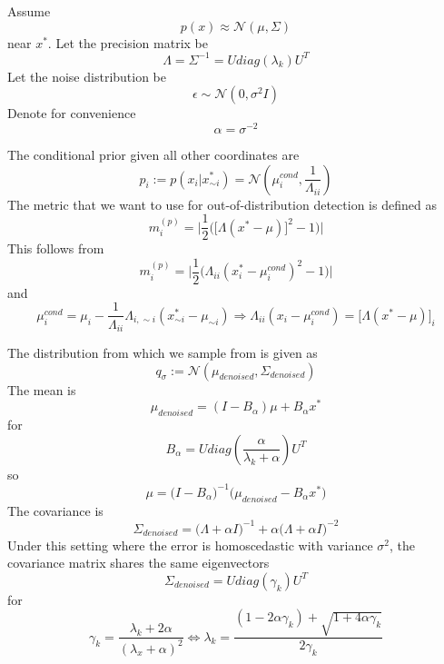 Assume
\begin{equation}
    p(x)\approx\mathcal{N}(\mu,\Sigma)
\end{equation} near $x^*$. Let the precision matrix be
\begin{equation}
    \Lambda=\Sigma^{-1}=Udiag(\lambda_k)U^T
\end{equation}
Let the noise distribution be
\begin{equation}
    \epsilon\sim\mathcal{N}(0,\sigma^2I)
\end{equation}
Denote for convenience
\begin{equation}
    \alpha=\sigma^{-2}
\end{equation}

\hfill \break
The conditional prior given all other coordinates are
\begin{equation}
    p_i:=p(x_i|x_{\sim i}^*)=\mathcal{N}(\mu_i^{cond},\frac{1}{\Lambda_{ii}})
\end{equation}
The metric that we want to use for out-of-distribution detection is defined as
\begin{equation}
    m_i^{(p)}=\Big\vert\frac{1}{2}\Big(\big[\Lambda(x^*-\mu)\big]^2-1\Big)\Big\vert
\end{equation}
This follows from
\begin{equation}
    m_i^{(p)}=\Big\vert\frac{1}{2}\Big(\Lambda_{ii}(x_i^*-\mu^{cond}_i)^2-1\Big)\Big\vert
\end{equation}
and
\begin{equation}
    \mu^{cond}_i=\mu_i-\frac{1}{\Lambda_{ii}}\Lambda_{i,\sim i}(x_{\sim i}^*-\mu_{\sim i})\Rightarrow\Lambda_{ii}(x_i-\mu_i^{cond})=\big[\Lambda(x^*-\mu)\big]_i
\end{equation}

\hfill \break
The distribution from which we sample from is given as
\begin{equation}
    q_\sigma:=\mathcal{N}(\mu_{denoised},\Sigma_{denoised})
\end{equation}
The mean is
\begin{equation}
    \mu_{denoised}=(I-B_{\alpha})\mu+B_{\alpha}x^*
\end{equation}
for
\begin{equation}
    B_\alpha=Udiag(\frac{\alpha}{\lambda_k+\alpha})U^T
\end{equation}
so
\begin{equation}
    \mu=\Big(I-B_\alpha\Big)^{-1}\Big(\mu_{denoised}-B_\alpha x^*\Big)
\end{equation}
The covariance is
\begin{equation}
    \Sigma_{denoised}=\Big(\Lambda+\alpha I\Big)^{-1}+\alpha\Big(\Lambda+\alpha I\Big)^{-2}
\end{equation}
Under this setting where the error is homoscedastic with variance $\sigma^2$, the covariance matrix shares the same eigenvectors
\begin{equation}
    \Sigma_{denoised}=Udiag(\gamma_k)U^T
\end{equation}
for
\begin{equation}
    \gamma_k=\frac{\lambda_k+2\alpha}{(\lambda_x+\alpha)^2}\Leftrightarrow\lambda_k=\frac{(1-2\alpha\gamma_k)+\sqrt{1+4\alpha\gamma_k}}{2\gamma_k}
\end{equation}

